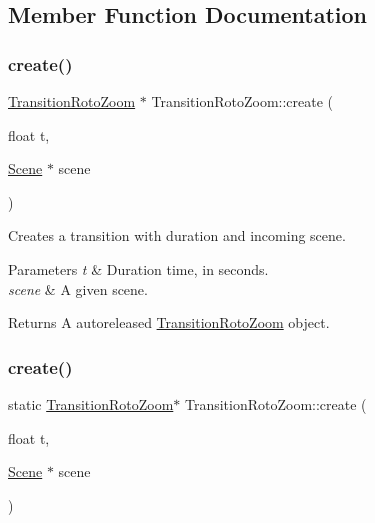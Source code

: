 \subsection{Member Function Documentation}
\mbox{\label{classTransitionRotoZoom_aae9f3b847a7144b77cab7525bfee40a8}} 
\subsubsection{\texorpdfstring{create()}{create()}\hspace{0.1cm}{\footnotesize\ttfamily [1/2]}}
{\footnotesize\ttfamily \hyperlink{classTransitionRotoZoom}{Transition\+Roto\+Zoom} $\ast$ Transition\+Roto\+Zoom\+::create (\begin{DoxyParamCaption}\item[{float}]{t,  }\item[{\hyperlink{classScene}{Scene} $\ast$}]{scene }\end{DoxyParamCaption})\hspace{0.3cm}{\ttfamily [static]}}

Creates a transition with duration and incoming scene.


\begin{DoxyParams}{Parameters}
{\em t} & Duration time, in seconds. \\
\hline
{\em scene} & A given scene. \\
\hline
\end{DoxyParams}
\begin{DoxyReturn}{Returns}
A autoreleased \hyperlink{classTransitionRotoZoom}{Transition\+Roto\+Zoom} object. 
\end{DoxyReturn}
\mbox{\label{classTransitionRotoZoom_ab8a03c28078d4d5723d3f1eb1f43ecfb}} 
\subsubsection{\texorpdfstring{create()}{create()}\hspace{0.1cm}{\footnotesize\ttfamily [2/2]}}
{\footnotesize\ttfamily static \hyperlink{classTransitionRotoZoom}{Transition\+Roto\+Zoom}$\ast$ Transition\+Roto\+Zoom\+::create (\begin{DoxyParamCaption}\item[{float}]{t,  }\item[{\hyperlink{classScene}{Scene} $\ast$}]{scene }\end{DoxyParamCaption})\hspace{0.3cm}{\ttfamily [static]}}

